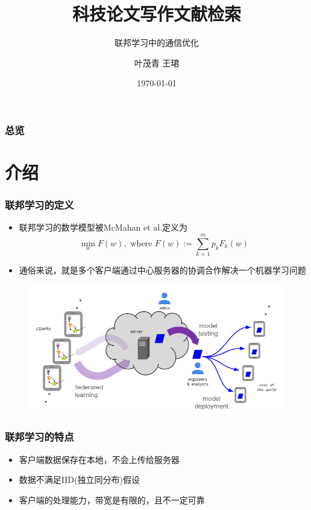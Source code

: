 \documentclass[hyperref={pdfpagelabels=false}]{beamer}
\title{科技论文写作文献检索}
\subtitle{联邦学习中的通信优化}
\author{ 叶茂青 \quad 王珺 }
\date{\today}
\begin{document}
\begin{frame}
\titlepage
\end{frame} 

\begin{frame}
	\frametitle{总览}
	\tableofcontents
\end{frame} 

\section{介绍}
\begin{frame}
	\tableofcontents[currentsection]
\end{frame} 

\begin{frame}
	\frametitle{联邦学习的定义}
	\begin{itemize}
		\item 联邦学习的数学模型被McMahan et al.定义为$$\min _{w} F(w), \text { where } F(w):=\sum_{k=1}^{m} p_{k} F_{k}(w)$$
		\item 通俗来说，就是多个客户端通过中心服务器的协调合作解决一个机器学习问题
	\end{itemize}
	\begin{figure}
		\centering
		\includegraphics[width=\textheight]{1.png}
	\end{figure}
\end{frame}


\begin{frame}
	\frametitle{联邦学习的特点}
	\begin{itemize}
		\item 客户端数据保存在本地，不会上传给服务器
		\item 数据不满足IID(独立同分布)假设
		\item 客户端的处理能力，带宽是有限的，且不一定可靠
	\end{itemize}
\end{frame}
\end{document}
